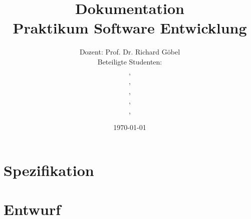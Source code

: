 \documentclass[11pt,dvipsnames]{scrreprt}%
\title{Dokumentation\\
Praktikum Software Entwicklung }
\author{Dozent: Prof. Dr. Richard Göbel \\
Beteiligte Studenten: \\
\sab, \\ \flo, \\ \eddy, \\ \ci, \\ \cii, \\ \ciii
}
\date{\today}
\begin{document}
\maketitle

\tableofcontents

\part{Spezifikation}




\part{Entwurf}




\end{document}
